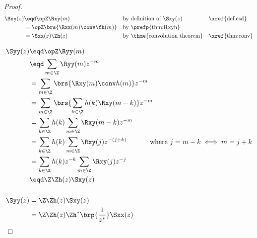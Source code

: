 \begin{proof}
\begin{align*}
  \Sxy(z)
     &\eqd \opZ \Rxy(m)
    && \text{by definition of $\Sxy(z)$}
    && \text{\xref{def:csd}}
   \\&= \opZ \brs{\Rxx(m) \conv \fh(m)}
    && \text{by \prefp{thm:Rxyh}}
   \\&= \Sxx(z)  \Zh(z)
    && \text{by \thme{convolution theorem}}
    && \text{\xref{thm:conv}}
\end{align*}

\begin{align*}
   \Syy(z)
     &\eqd \opZ \Ryy(m)
   \\&\eqd \sum_{m\in\Z}\Ryy(m) z^{-m}
   \\&=    \sum_{m\in\Z}\brs{ \Rxy(m) \conv h(m) } z^{-m}
   \\&=    \sum_{m\in\Z}\brs{ \sum_{k\in\Z}h(k) \Rxy(m-k)  } z^{-m}
   \\&=    \sum_{k\in\Z}h(k) \sum_{m\in\Z}\Rxy(m-k) z^{-m}
   \\&=    \sum_{k\in\Z}h(k) \sum_{m\in\Z}\Rxy(j) z^{-(j+k)}
           \hspace{3em}\mbox{ where $j=m-k\iff m=j+k$}
   \\&=    \sum_{k\in\Z}h(k)z^{-k}   \sum_{m\in\Z}\Rxy(j) z^{-j}
   \\&\eqd \Z\Zh(z) \Sxy(z)
\\
\\
   \Syy(z)
     &= \Z\Zh(z) \Sxy(z)
   \\&= \Z\Zh(z) \Zh^\ast\brp{\frac{1}{z^\ast}} \Sxx(z)
\end{align*}
\end{proof}

